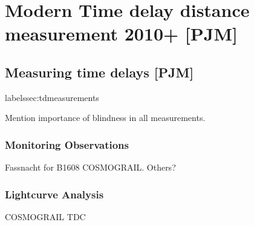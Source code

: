 
\section{Modern Time delay distance measurement 2010+ [PJM]}
\label{sec:timedelay}






\subsection{Measuring time delays [PJM]}
label{ssec:tdmeasurements}


Mention importance of blindness in all measurements. 



\subsubsection{Monitoring Observations}




Fassnacht for B1608
COSMOGRAIL.
Others?



\subsubsection{Lightcurve Analysis}



COSMOGRAIL
TDC



